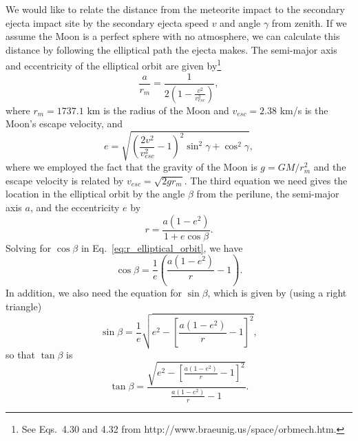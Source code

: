 \documentclass{hitec}
\numberwithin{equation}{section}
\begin{document}
We would like to relate the distance from the meteorite impact to the secondary ejecta impact site by the secondary ejecta speed $v$ and angle $\gamma$ from zenith. If we assume the Moon is a perfect sphere with no atmosphere, we can calculate this distance by following the elliptical path the ejecta makes. The semi-major axis and eccentricity of the elliptical orbit are given by\footnote{See Eqs.\ 4.30 and 4.32 from http://www.braeunig.us/space/orbmech.htm.}
\begin{equation}\label{eq:a_of_v}
\frac{a}{r_m} = \frac{1}{2\left(1-\frac{v^2}{v_{esc}^2}\right)},
\end{equation}
where $r_m = 1737.1$ km is the radius of the Moon and $v_{esc} = 2.38$ km/s is the Moon's escape velocity, and
\begin{equation}\label{eq:e_of_v}
e = \sqrt{\left(\frac{2v^2}{v_{esc}^2}-1\right)^2\sin^2\gamma + \cos^2\gamma},
\end{equation}
where we employed the fact that the gravity of the Moon is $g = GM/r_m^2$ and the escape velocity is related by $v_{esc} = \sqrt{2gr_m}$. The third equation we need gives the location in the elliptical orbit by the angle $\beta$ from the perilune, the semi-major axis $a$, and the eccentricity $e$ by
\begin{equation}\label{eq:r_elliptical_orbit}
r = \frac{a(1-e^2)}{1+e\cos\beta}.
\end{equation}
Solving for $\cos\beta$ in Eq.\ \ref{eq:r_elliptical_orbit}, we have
\begin{equation}\label{eq:cos_elliptical_orbit}
\cos\beta = \frac{1}{e}\left(\frac{a(1-e^2)}{r}-1\right).
\end{equation}
In addition, we also need the equation for $\sin\beta$, which is given by (using a right triangle)
\begin{equation}
\sin\beta = \frac{1}{e}\sqrt{e^2-\left[\frac{a(1-e^2)}{r}-1\right]^2},
\end{equation}
so that $\tan\beta$ is
\begin{equation}\label{eq:tan_beta}
\tan\beta = \frac{\sqrt{e^2-\left[\frac{a(1-e^2)}{r}-1\right]^2}}{\frac{a(1-e^2)}{r}-1}.
\end{equation}
\end{document}
